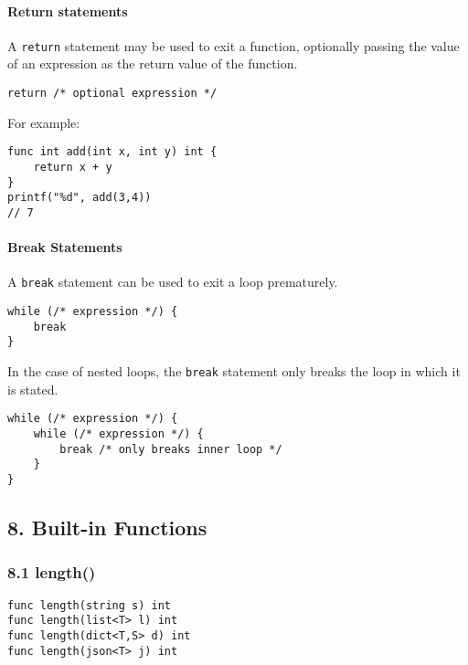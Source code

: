 \documentclass[]{article}
\begin{document}
\paragraph{Return statements}\label{return-statements}

A \texttt{return} statement may be used to exit a function, optionally
passing the value of an expression as the return value of the function.

\begin{verbatim}
return /* optional expression */
\end{verbatim}

For example:

\begin{verbatim}
func int add(int x, int y) int {
    return x + y
}
printf("%d", add(3,4))
// 7
\end{verbatim}

\paragraph{Break Statements}\label{break-statements}

A \texttt{break} statement can be used to exit a loop prematurely.

\begin{verbatim}
while (/* expression */) {
    break
}
\end{verbatim}

In the case of nested loops, the \texttt{break} statement only breaks
the loop in which it is stated.

\begin{verbatim}
while (/* expression */) {
    while (/* expression */) {
        break /* only breaks inner loop */
    }
}
\end{verbatim}

\subsection{8. Built-in Functions}\label{built-in-functions}

\subsubsection{8.1 length()}\label{length}

\begin{verbatim}
func length(string s) int
func length(list<T> l) int
func length(dict<T,S> d) int
func length(json<T> j) int
\end{verbatim}
\end{document}
